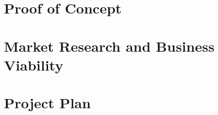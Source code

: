 \documentclass[12pt]{article}
\begin{document}
\section{Proof of Concept}


\section{Market Research and Business Viability}


\section{Project Plan}


\newpage

\printbibliography

\newpage

\begin{appendices}
    
\end{appendices}
\end{document}
